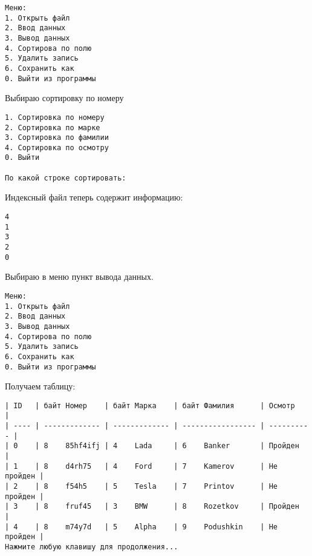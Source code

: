 \begin{tcolorbox}
\begin{verbatim}
Меню:
1. Открыть файл
2. Ввод данных       
3. Вывод данных      
4. Сортирова по полю 
5. Удалить запись    
6. Сохранить как     
0. Выйти из программы
\end{verbatim}
\end{tcolorbox}

Выбираю сортировку по номеру

\begin{tcolorbox}
\begin{verbatim}
1. Сортировка по номеру
2. Сортировка по марке
3. Сортировка по фамилии
4. Сортировка по осмотру
0. Выйти

По какой строке сортировать: 
\end{verbatim}
\end{tcolorbox}

Индексный файл теперь содержит информацию:

\begin{tcolorbox}
\begin{verbatim}
4
1
3
2
0
\end{verbatim}
\end{tcolorbox}

Выбираю в меню пункт вывода данных.

\begin{tcolorbox}
\begin{verbatim}
Меню:
1. Открыть файл
2. Ввод данных       
3. Вывод данных      
4. Сортирова по полю 
5. Удалить запись    
6. Сохранить как     
0. Выйти из программы
\end{verbatim}
\end{tcolorbox}

Получаем таблицу:

\begin{tcolorbox}
\begin{verbatim}
| ID   | байт Номер    | байт Марка    | байт Фамилия      | Осмотр     | 
| ---- | ------------- | ------------- | ----------------- | ---------- | 
| 0    | 8    85hf4ifj | 4    Lada     | 6    Banker       | Пройден    | 
| 1    | 8    d4rh75   | 4    Ford     | 7    Kamerov      | Не пройден | 
| 2    | 8    f54h5    | 5    Tesla    | 7    Printov      | Не пройден | 
| 3    | 8    fruf45   | 3    BMW      | 8    Rozetkov     | Пройден    | 
| 4    | 8    m74y7d   | 5    Alpha    | 9    Podushkin    | Не пройден | 
Нажмите любую клавишу для продолжения...
\end{verbatim}
\end{tcolorbox}

